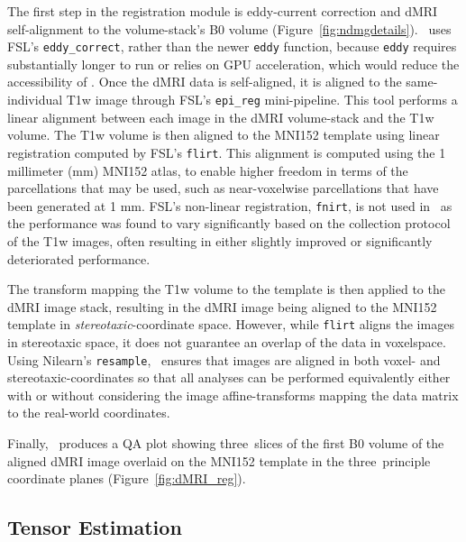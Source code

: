 \documentclass[11pt]{article}
\begin{document}
The first step in the registration module is eddy-current correction and dMRI
self-alignment to the volume-stack's B0 volume (Figure~\ref{fig:ndmgdetails}). \ndmg~uses FSL's \texttt{eddy\_correct}, rather than the newer \texttt{eddy} function, because \texttt{eddy} requires substantially longer to run or relies on GPU acceleration, which would reduce the accessibility of \ndmg.
%
%
Once the dMRI data is self-aligned, it is aligned to the same-individual T1w image through FSL's \texttt{epi\_reg} mini-pipeline. This
tool performs a linear alignment between each image in the dMRI volume-stack and the T1w volume.
%
The T1w volume is then aligned to the MNI152 template using linear registration computed by FSL's \texttt{flirt}. This
alignment is computed using the 1 millimeter (mm) MNI152 atlas, to enable higher freedom in terms of the parcellations that may
be used, such as near-voxelwise parcellations that have been generated at 1 mm. FSL's non-linear registration,
\texttt{fnirt}, is not used in \ndmg~as the performance was found to vary significantly based on the collection
protocol of the T1w images, often resulting in either slightly improved or significantly deteriorated performance.

The transform mapping the T1w volume to the template is then applied to the dMRI image stack, resulting in the dMRI image
being aligned to the MNI152 template in \textit{stereotaxic}-coordinate space. However, while \texttt{flirt} aligns the images
in stereotaxic space, it does not guarantee an overlap of the data in voxelspace. Using Nilearn's \texttt{resample},
\ndmg~ensures that images are aligned in both voxel- and stereotaxic-coordinates so that all analyses can be performed
equivalently either with or without considering the image affine-transforms mapping the data matrix to the
real-world coordinates.

Finally, \ndmg~produces a QA plot showing three~slices of the first B0 volume of the aligned dMRI image overlaid on the
MNI152 template in the three~principle coordinate planes (Figure~\ref{fig:dMRI_reg}).  


\subsection{Tensor Estimation}
\label{app:tensors}



\end{document}
